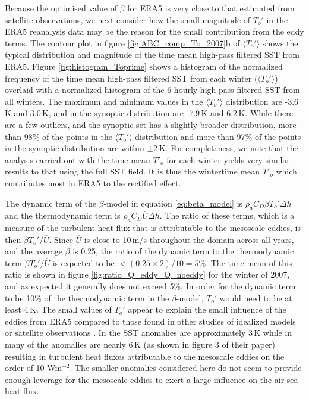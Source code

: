 Because the optimised value of $\beta$ for ERA5 is very close to that estimated from satellite observations, we next consider how the small magnitude of $T_o'$ in the ERA5 reanalysis data may be the reason for the small contribution from the eddy terms. The contour plot in figure \ref{fig:ABC_comp_To_2007}b of $\langle T_o'\rangle$ shows the typical distribution and magnitude of the time mean high-pass filtered SST from ERA5. Figure \ref{fig:histogram_Toprime} shows a histogram of the normalized frequency of the time mean high-pass filtered SST from each winter ($\langle T_o' \rangle$) overlaid with a normalized histogram of the 6-hourly high-pass filtered SST from all winters. The maximum and minimum values in the $\langle T_o' \rangle$ distribution are -3.6\,K and 3.0\,K, and in the synoptic distribution are -7.9\,K and 6.2\,K. While there are a few outliers, and the synoptic set has a slightly broader distribution, more than 98\% of the points in the $\langle T_o' \rangle$ distribution and more than 97\% of the points in the synoptic distribution are within $\pm$2\,K. For completeness, we note that the analysis carried out with the time mean $T'_o$ for each winter yields very similar results to that using the full SST field. It is thus the wintertime mean $T'_o$ which contributes most in ERA5 to the rectified effect.\par 

The dynamic term of the $\beta$-model in equation \ref{eq:beta_model} is $\rho_a C_D \beta T_o'\Delta h$ and the thermodynamic term is $\rho_a C_D\overline{U}\Delta h$. The ratio of these terms, which is a measure of the turbulent heat flux that is attributable to the mesoscale eddies, is then $\beta T_o'/\overline{U}$. Since $\overline{U}$ is close to 10\,m/s throughout the domain across all years, and the average $\beta$ is 0.25, the ratio of the dynamic term to the thermodynamic term $\beta T_o'/\overline{U}$ is expected to be $< (0.25\times 2)/10 = 5$\%. The time mean of this ratio is shown in figure \ref{fig:ratio_Q_eddy_Q_noeddy} for the winter of 2007, and as expected it generally does not exceed 5\%. In order for the dynamic term to be 10\% of the thermodynamic term in the $\beta$-model, $T_o'$ would need to be at least 4\,K. The small values of $T_o'$ appear to explain the small influence of the eddies from ERA5 compared to those found in other studies of idealized models or satellite observations \citep{foussard2019storm,ma2017revised}. In \citet{ma2017revised} the SST anomalies are approximately 3\,K while in \citet{foussard2019storm} many of the anomalies are nearly 6\,K (as shown in figure 3 of their paper) resulting in turbulent heat fluxes attributable to the mesoscale eddies on the order of 10 Wm$^{-2}$. The smaller anomalies considered here do not seem to provide enough leverage for the mesoscale eddies to exert a large influence on the air-sea heat flux.


